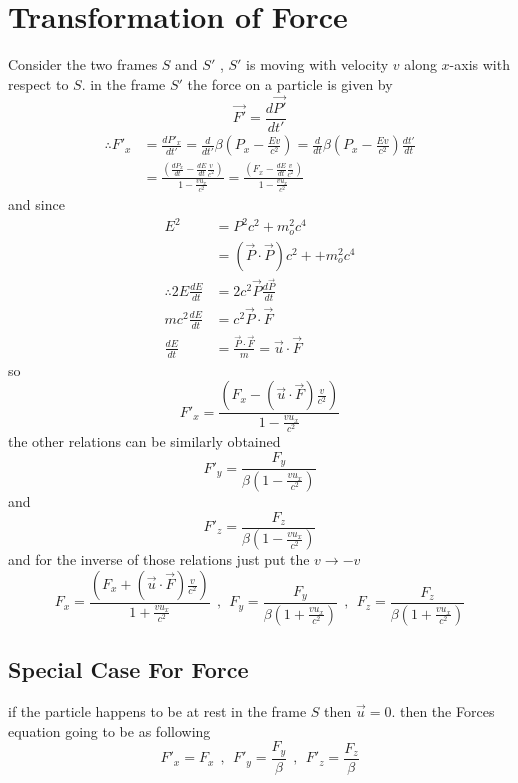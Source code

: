\documentclass{article}
\begin{document}
\section{Transformation of Force}
Consider the two frames $S$ and $S'$ , $S'$ is moving with velocity $v$ along $x$-axis with respect to $S$.
in the frame $S'$ the force on a particle is given by 
\[
\vec{F'}  = \frac{d\vec{P'}}{dt'}
\]
\begin{align*}
    \therefore F'_x &= \frac{dP'_x}{dt'} = \frac{d}{dt'} \beta\left(P_x - \frac{Ev}{c^2}\right)
                = \frac{d}{dt} \beta\left(P_x - \frac{Ev}{c^2}\right) \frac{dt'}{dt}\\
               &=\frac{\left(\frac{dP_x}{dt} - \frac{dE}{dt}\frac{v}{c^2}\right)}{1 - \frac{vu_x}{c^2}} =\frac{\left(F_x - \frac{dE}{dt}\frac{v}{c^2}\right)}{1 - \frac{vu_x}{c^2}}            
\end{align*}
and since
\begin{align*}
    E^2 &= P^2c^2 + m_o^2 c^4 \\
        &= \left(\vec{P}\cdot\vec{P}\right) c^2 + + m_o^2 c^4\\
\therefore 2E \frac{dE}{dt} &=2 c^2 \vec{P} \frac{d\vec{P}}{dt}\\
        m c^2 \frac{dE}{dt} &=c^2 \vec{P} \cdot \vec{F}\\
        \frac{dE}{dt} &= \frac{\vec{P} \cdot \vec{F}}{m} = \vec{u} \cdot \vec{F}
\end{align*}
so 
\[
F'_x = \frac{\left(F_x - \left(\vec{u} \cdot \vec{F}\right)\frac{v}{c^2}\right)}{1 - \frac{vu_x}{c^2}}
\]
the other relations can be similarly obtained
\[
F'_y = \frac{F_y}{\beta\left(1 - \frac{vu_x}{c^2}\right)}
\]
and 
\[
F'_z = \frac{F_z}{\beta\left(1 - \frac{vu_x}{c^2}\right)}
\]
and for the inverse of those relations just put the $v \to -v$
\[
    F_x = \frac{\left(F_x + \left(\vec{u} \cdot \vec{F}\right)\frac{v}{c^2}\right)}{1 + \frac{vu_x}{c^2}}
    \ \ , \ \  
    F_y = \frac{F_y}{\beta\left(1 + \frac{vu_x}{c^2}\right)}   
    \ \ , \ \  
    F_z = \frac{F_z}{\beta\left(1 + \frac{vu_x}{c^2}\right)}
\]
\subsection{Special Case For Force}
if the particle happens to be at rest in the frame $S$ then $\vec{u} = 0$. then the Forces equation going to be as following
\[
    F'_x = F_x
    \ \ , \ \  
    F'_y = \frac{F_y}{\beta}
    \ \ , \ \  
    F'_z = \frac{F_z}{\beta}
\]
\end{document}
